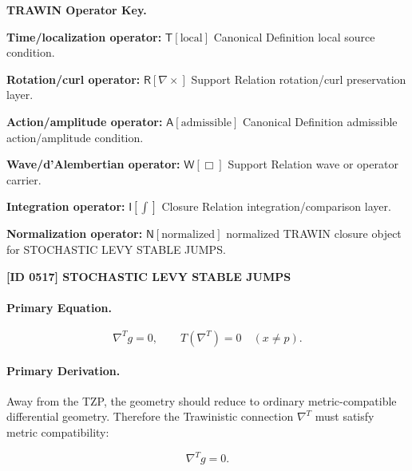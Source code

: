 \par\vspace{0.45\baselineskip}
\noindent\begin{minipage}[t]{\linewidth}
\begingroup
\small
\raggedright
\textbf{TRAWIN Operator Key.}\par
\noindent\textbf{Time/localization operator:} $\mathsf{T}\!\left[\mathrm{local}\right]$ Canonical Definition local source condition.\par
\noindent\textbf{Rotation/curl operator:} $\mathsf{R}\!\left[\nabla\times\right]$ Support Relation rotation/curl preservation layer.\par
\noindent\textbf{Action/amplitude operator:} $\mathsf{A}\!\left[\mathrm{admissible}\right]$ Canonical Definition admissible action/amplitude condition.\par
\noindent\textbf{Wave/d'Alembertian operator:} $\mathsf{W}\!\left[\Box\right]$ Support Relation wave or operator carrier.\par
\noindent\textbf{Integration operator:} $\mathsf{I}\!\left[\int\right]$ Closure Relation integration/comparison layer.\par
\noindent\textbf{Normalization operator:} $\mathsf{N}\!\left[\mathrm{normalized}\right]$ normalized TRAWIN closure object for STOCHASTIC LEVY STABLE JUMPS.\par
\endgroup
\end{minipage}

\clearpage
\noindent\textbf{[ID 0517] STOCHASTIC LEVY STABLE JUMPS}\par
\vspace{0.35em}
\paragraph{Primary Equation.}
\begin{equation}
\nabla^{T}g=0,
\qquad
T(\nabla^{T})=0
\quad
(x\neq p).
\end{equation}

\paragraph{Primary Derivation.}
Away from the TZP, the geometry should reduce to ordinary metric-compatible differential geometry. Therefore the Trawinistic connection $\nabla^{T}$ must satisfy metric compatibility:

\begin{equation}
\nabla^{T}g=0 .
\end{equation}

